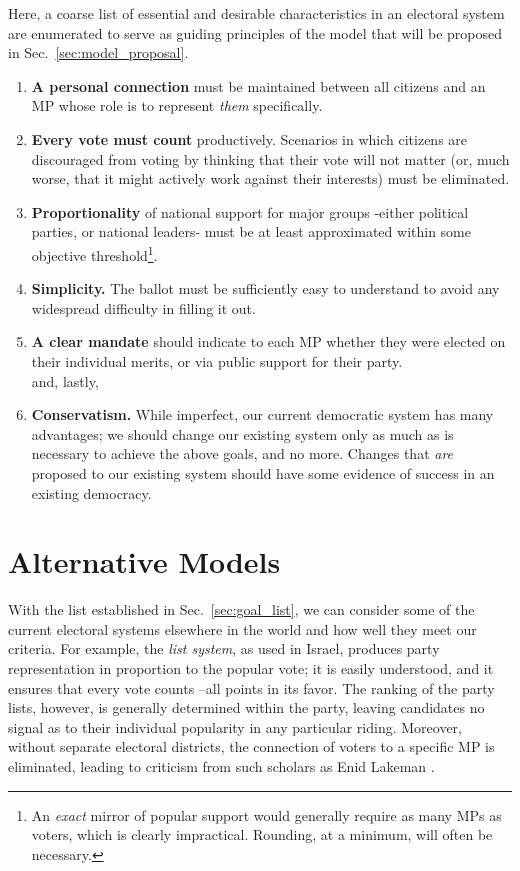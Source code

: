 \documentclass[DIV=calc, paper=a4, fontsize=11pt, twocolumn]{scrartcl}	 %
\begin{document}
Here, a coarse list of essential and desirable characteristics in an electoral system are enumerated to serve as guiding principles of the model that will be proposed in Sec.~\ref{sec:model_proposal}.  
\begin{enumerate}
\item \textbf{A personal connection} must be maintained between all citizens and an MP whose role is to represent \emph{them} specifically.   
\item \textbf{Every vote must count} productively. Scenarios in which citizens are discouraged from voting by thinking that their vote will not matter (or, much worse, that it might actively work against their interests) must be eliminated.
\item \textbf{Proportionality} of national support for major groups \--either political parties, or national leaders\-- must be at least approximated within some objective threshold\footnote{
An \emph{exact} mirror of popular support would generally require as many MPs as voters, which is clearly impractical. Rounding, at a minimum, will often be necessary.
}. 
\item   \textbf{Simplicity.} The ballot must be sufficiently easy to understand to avoid any widespread difficulty in filling it out. 

\item  \textbf{A clear mandate} should indicate to each MP whether they were elected on their individual merits, or via public support for their party.
\\
and, lastly, 
\item \textbf{Conservatism.} While imperfect, our current democratic system has many advantages; we should change our existing system only as much as is necessary to achieve the above goals, and no more. Changes that \emph{are} proposed to our existing system should have some evidence of success in an existing democracy.
\end{enumerate}


\section{Alternative Models}
\label{sec:alt_models}

With the list established in Sec.~\ref{sec:goal_list}, we can consider some of the current electoral systems elsewhere in the world and how well they meet our criteria. For example, the \emph{list system}, as used in Israel, produces party representation in proportion to the popular vote; it is easily understood, and it ensures that every vote counts \---all points in its favor. 
The ranking of the party lists, however, is generally determined within the party, leaving candidates no signal as to their individual popularity in any particular riding. Moreover, without separate electoral districts, the connection of voters to a specific MP is eliminated, leading to criticism from such scholars as Enid Lakeman\cite{Lakeman}
.
\end{document}
